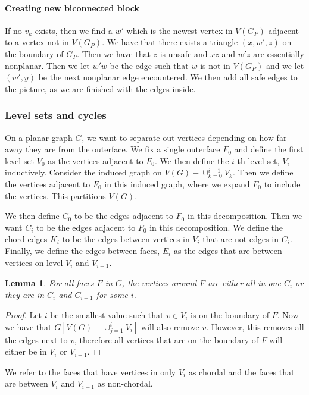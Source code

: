 \documentclass[]{report}
\newtheorem{lemma}[theorem]{Lemma}
\theoremstyle{definition}
\numberwithin{theorem}{section}
\numberwithin{equation}{section}
\begin{document}
\paragraph{Creating new biconnected block}
If no $v_k$ exists, then we find a $w'$ which is the newest vertex in $V(G_P)$ adjacent to a vertex not in $V(G_P)$. We have that there exists a triangle $(x, w', z)$ on the boundary of $G_P$. Then we have that $z$ is unsafe and $xz$ and $w'z$ are essentially nonplanar. Then we let $w'w$ be the edge such that $w$ is not in $V(G_P)$ and we let $(w', y)$ be the next nonplanar edge encountered. 
We then add all safe edges to the picture, as we are finished with the edges inside.

\subsubsection{Level sets and cycles}
On a planar graph $G$, we want to separate out vertices depending on how far away they are from the outerface. We fix a single outerface $F_0$ and define the first level set $V_0$ as the vertices adjacent to $F_0$. We then define the $i$-th level set, $V_i$ inductively. Consider the induced graph on $V(G) - \cup_{k = 0}^{i-1} V_k$. Then we define the vertices adjacent to $F_0$ in this induced graph, where we expand $F_0$ to include the vertices. This partitions $V(G)$.

We then define $C_0$ to be the edges adjacent to $F_0$ in this decomposition. Then we want $C_i$ to be the edges adjacent to $F_0$ in this decomposition. We define the chord edges $K_i$ to be the edges between vertices in $V_i$ that are not edges in $C_i$. Finally, we define the edges between faces, $E_i$ as the edges that are between vertices on level $V_i$ and $V_{i + 1}$.

\begin{lemma}
	For all faces $F$ in $G$, the vertices around $F$ are either all in one $C_i$ or they are in $C_i$ and $C_{i + 1}$ for some $i$.
\end{lemma}

\begin{proof}
	Let $i$ be the smallest value such that $v \in V_i$ is on the boundary of $F$. Now we have that $G[V(G) - \cup_{j = 1}^{i} V_i]$ will also remove $v$. However, this removes all the edges next to $v$, therefore all vertices that are on the boundary of $F$ will either be in $V_i$ or $V_{i + 1}$.
\end{proof}
We refer to the faces that have vertices in only $V_i$ as chordal and the faces that are between $V_i$ and $V_{i + 1}$ as non-chordal.
\end{document}

